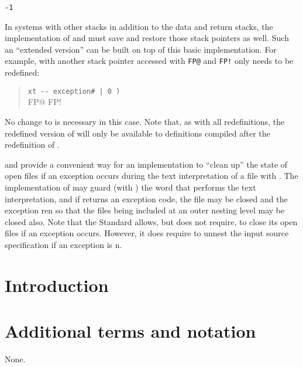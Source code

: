 \begin{intro}
\tab \word{:} 
	\texttt{-1} 
\word{;}

In systems with other stacks in addition to the data and return stacks,
the implementation of  and 
must save and restore those stack pointers as well. Such an ``extended
version'' can be built on top of this basic implementation. For example,
with another stack pointer accessed with \texttt{FP@} and \texttt{FP!}
only  needs to be redefined:

\begin{quote}\ttfamily
	\word{:} 
		 \texttt{xt -{}- exception\# | 0 )} \\
	\tab FP@   
		  FP!   
	\word{;}
\end{quote}

No change to  is necessary in this case. Note that, as
with all redefinitions, the redefined version of  will
only be available to definitions compiled after the redefinition of
.

 and  provide a convenient way for an
implementation to ``clean up'' the state of open files if an
exception occurs during the text interpretation of a file with
. The implementation of
 may guard (with ) the word
that performs the text interpretation, and if  returns
an exception code, the file may be closed and the exception
ren so that the files being included at an outer nesting
level may be closed also. Note that the Standard allows, but does not
require,  to close its open files if an
exception occurs. However, it does require 
to unnest the input source specification if an exception is
n.
\end{intro}

\section{Introduction} %

\section{Additional terms and notation} %
None.

